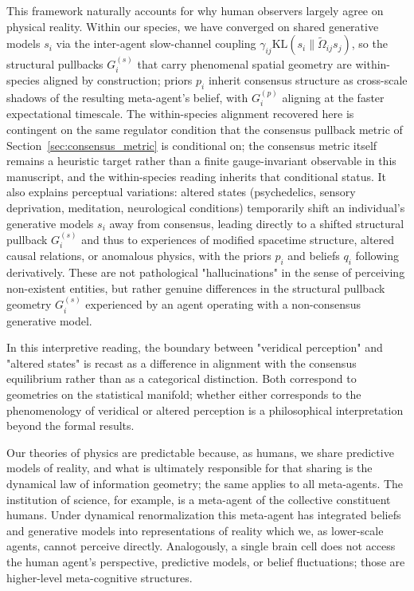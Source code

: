 \documentclass[11pt]{article}
\begin{document}
This framework naturally accounts for why human observers largely agree
on physical reality. Within our species, we have converged on shared generative models $s_i$ via the inter-agent slow-channel coupling $\gamma_{ij}\mathrm{KL}(s_i\|\tilde\Omega_{ij}s_j)$, so the structural pullbacks $G^{(s)}_i$ that carry phenomenal spatial geometry are within-species aligned by construction; priors $p_i$ inherit consensus structure as cross-scale shadows of the resulting meta-agent's belief, with $G^{(p)}_i$ aligning at the faster expectational timescale. The within-species alignment recovered here is contingent on the same regulator condition that the consensus pullback metric of Section~\ref{sec:consensus_metric} is conditional on; the consensus metric itself remains a heuristic target rather than a finite gauge-invariant observable in this manuscript, and the within-species reading inherits that conditional status. It also explains perceptual variations: altered states (psychedelics, sensory deprivation, meditation, neurological conditions) temporarily shift an individual's generative models $s_i$ away from consensus, leading directly to a shifted structural pullback $G^{(s)}_i$ and thus to experiences of modified spacetime structure, altered causal relations, or anomalous physics, with the priors $p_i$ and beliefs $q_i$ following derivatively. These are not pathological "hallucinations" in the sense of perceiving non-existent entities, but rather genuine differences in the structural pullback geometry $G^{(s)}_i$ experienced by an agent operating with a non-consensus generative model.

In this interpretive reading, the boundary between "veridical perception" and "altered states" is recast as a difference in alignment with the consensus equilibrium rather than as a categorical distinction. Both correspond to geometries on the statistical manifold; whether either corresponds to the phenomenology of veridical or altered perception is a philosophical interpretation beyond the formal results.

Our theories of physics are predictable because, as humans, we share predictive models of reality, and what is ultimately responsible for that sharing is the dynamical law of information geometry; the same applies to all meta-agents. The institution of science, for example, is a meta-agent of the collective constituent humans. Under dynamical renormalization this meta-agent has integrated beliefs and generative models into representations of reality which we, as lower-scale agents, cannot perceive directly. Analogously, a single brain cell does not access the human agent's perspective, predictive models, or belief fluctuations; those are higher-level meta-cognitive structures.
\end{document}
